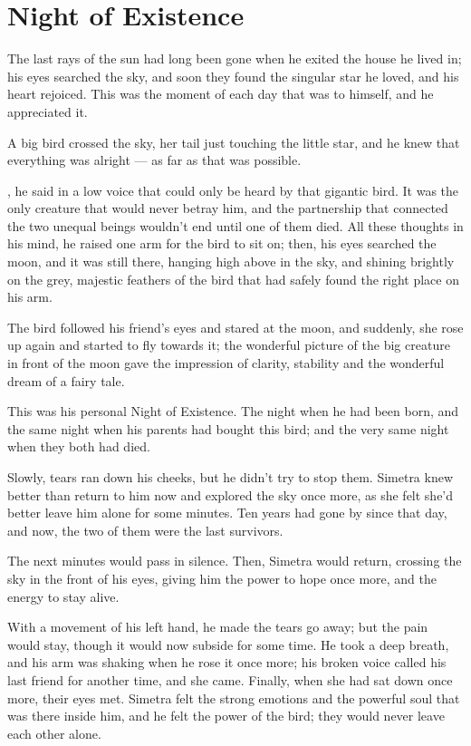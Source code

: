 \chapter{Night of Existence}
\label{cha:night-existence}
The last rays of the sun had long been gone when he exited the house he lived in; his eyes searched the sky, and soon they found the singular star he loved, and his heart rejoiced. This was the moment of each day that was to himself, and he appreciated it.

A big bird crossed the sky, her tail just touching the little star, and he knew that everything was alright --- as far as that was possible.

, he said in a low voice that could only be heard by that gigantic bird. It was the only creature that would never betray him, and the partnership that connected the two unequal beings wouldn't end until one of them died. All these thoughts in his mind, he raised one arm for the bird to sit on; then, his eyes searched the moon, and it was still there, hanging high above in the sky, and shining brightly on the grey, majestic feathers of the bird that had safely found the right place on his arm.

The bird followed his friend's eyes and stared at the moon, and suddenly, she rose up again and started to fly towards it; the wonderful picture of the big creature in front of the moon gave the impression of clarity, stability and the wonderful dream of a fairy tale.

This was his personal Night of Existence. The night when he had been born, and the same night when his parents had bought this bird; and the very same night when they both had died.

Slowly, tears ran down his cheeks, but he didn't try to stop them. Simetra knew better than return to him now and explored the sky once more, as she felt she'd better leave him alone for some minutes. Ten years had gone by since that day, and now, the two of them were the last survivors.

The next minutes would pass in silence. Then, Simetra would return, crossing the sky in the front of his eyes, giving him the power to hope once more, and the energy to stay alive.

With a movement of his left hand, he made the tears go away; but the pain would stay, though it would now subside for some time. He took a deep breath, and his arm was shaking when he rose it once more; his broken voice called his last friend for another time, and she came. Finally, when she had sat down once more, their eyes met. Simetra felt the strong emotions and the powerful soul that was there inside him, and he felt the power of the bird; they would never leave each other alone.

